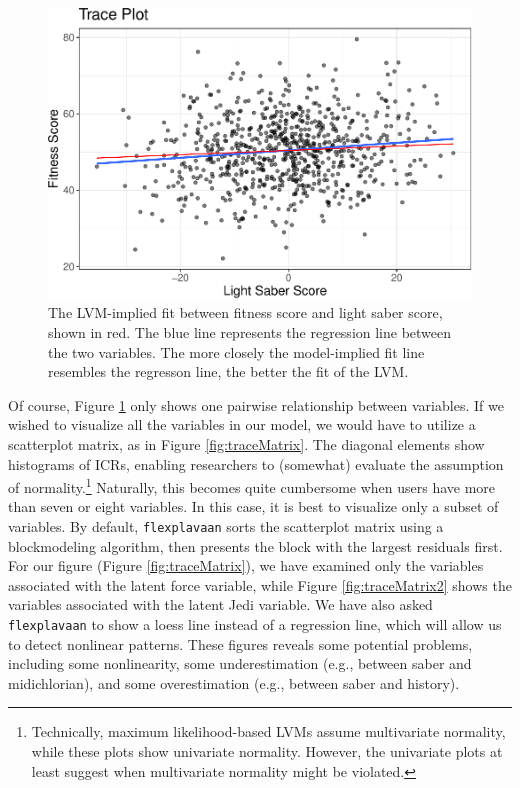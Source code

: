 \documentclass[
  english,
  doc]{apa6}
\begin{document}
\begin{figure}
\centering
\includegraphics{flexplavaan_draft_files/figure-latex/trace1-1.pdf}
\caption{\label{fig:trace1}The LVM-implied fit between fitness score and light saber score, shown in red. The blue line represents the regression line between the two variables. The more closely the model-implied fit line resembles the regresson line, the better the fit of the LVM.}
\end{figure}

Of course, Figure \ref{fig:trace1} only shows one pairwise relationship between variables. If we wished to visualize all the variables in our model, we would have to utilize a scatterplot matrix, as in Figure \ref{fig:traceMatrix}. The diagonal elements show histograms of ICRs, enabling researchers to (somewhat) evaluate the assumption of normality.\footnote{Technically, maximum likelihood-based LVMs assume multivariate normality, while these plots show univariate normality. However, the univariate plots at least suggest when multivariate normality might be violated.} Naturally, this becomes quite cumbersome when users have more than seven or eight variables. In this case, it is best to visualize only a subset of variables. By default, \texttt{flexplavaan} sorts the scatterplot matrix using a blockmodeling algorithm, then presents the block with the largest residuals first. For our figure (Figure \ref{fig:traceMatrix}), we have examined only the variables associated with the latent force variable, while Figure \ref{fig:traceMatrix2} shows the variables associated with the latent Jedi variable. We have also asked \texttt{flexplavaan} to show a loess line instead of a regression line, which will allow us to detect nonlinear patterns. These figures reveals some potential problems, including some nonlinearity, some underestimation (e.g., between saber and midichlorian), and some overestimation (e.g., between saber and history).
\end{document}
